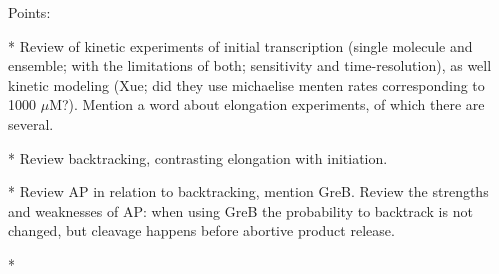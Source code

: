 Points:

* Review of kinetic experiments of initial transcription (single molecule and
ensemble; with the limitations of both; sensitivity and time-resolution), as
well kinetic modeling (Xue; did they use michaelise menten rates corresponding
to 1000 $\mu$M?). Mention a word about elongation experiments, of which there
are several.

* Review backtracking, contrasting elongation with initiation.

* Review AP in relation to backtracking, mention GreB. Review the strengths
and weaknesses of AP: when using GreB the probability to backtrack is not
changed, but cleavage happens before abortive product release.

*
